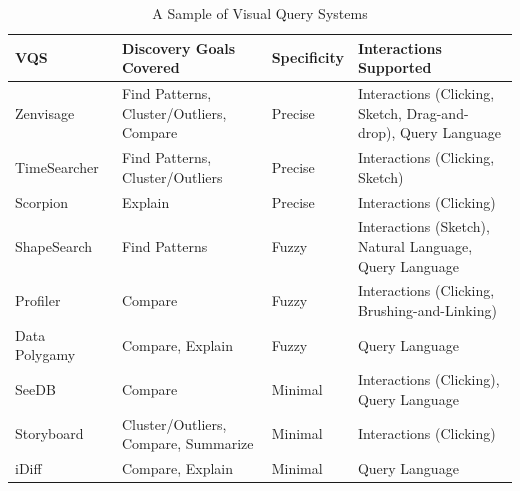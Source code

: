 \begin{table}[!t]
\scriptsize
\centering
\begin{tabular}{l|l|l|p{7.5cm}}
VQS & Discovery Goals Covered & Specificity & Interactions Supported \\ \hline

Zenvisage~\cite{Lee2017,Siddiqui2016} & Find Patterns, Cluster/Outliers, Compare & Precise & Interactions (Clicking, Sketch, Drag-and-drop), Query Language \\
TimeSearcher~\cite{hochheiser2004dynamic} & Find Patterns, Cluster/Outliers & Precise & Interactions (Clicking, Sketch) \\
Scorpion~\cite{Wu2013} & Explain & Precise & Interactions (Clicking) \\

ShapeSearch~\cite{Siddiqui2018} & Find Patterns & Fuzzy & Interactions (Sketch), Natural Language, Query Language \\
Profiler~\cite{Kandel2012} & Compare & Fuzzy & Interactions (Clicking, Brushing-and-Linking) \\
Data Polygamy~\cite{chirigati2016data} & Compare, Explain & Fuzzy & Query Language \\
SeeDB~\cite{Vartak2015} & Compare & Minimal & Interactions (Clicking), Query Language \\
Storyboard~\cite{Lee2018} & Cluster/Outliers, Compare, Summarize & Minimal & Interactions (Clicking) \\
iDiff~\cite{Sarawagi1998,Sarawagi2000} & Compare, Explain & Minimal & Query Language \\

\end{tabular}
\vspace{-10pt}
\caption{A Sample of Visual Query Systems}\label{fig:table}
\vspace{-10pt}
\end{table}


